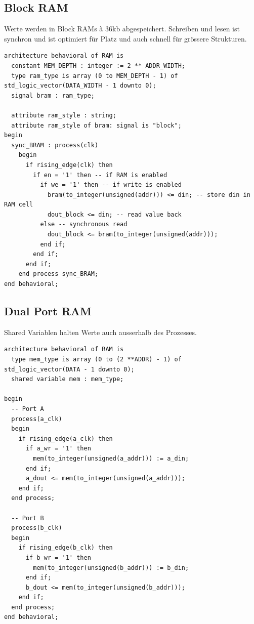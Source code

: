 \subsection{Block RAM}
Werte werden in Block RAMs à 36kb abgespeichert. Schreiben und lesen ist synchron und ist optimiert für Platz und auch schnell für grössere Strukturen.

\begin{lstlisting}
architecture behavioral of RAM is
  constant MEM_DEPTH : integer := 2 ** ADDR_WIDTH;
  type ram_type is array (0 to MEM_DEPTH - 1) of std_logic_vector(DATA_WIDTH - 1 downto 0);
  signal bram : ram_type;

  attribute ram_style : string;
  attribute ram_style of bram: signal is "block";
begin
  sync_BRAM : process(clk)
    begin
      if rising_edge(clk) then
        if en = '1' then -- if RAM is enabled
          if we = '1' then -- if write is enabled
            bram(to_integer(unsigned(addr))) <= din; -- store din in RAM cell
            dout_block <= din; -- read value back
          else -- synchronous read
            dout_block <= bram(to_integer(unsigned(addr)));
          end if;
        end if;
      end if;
    end process sync_BRAM;
end behavioral;
\end{lstlisting}

\subsection{Dual Port RAM}
Shared Variablen halten Werte auch ausserhalb des Prozesses.
\begin{lstlisting}
architecture behavioral of RAM is
  type mem_type is array (0 to (2 **ADDR) - 1) of std_logic_vector(DATA - 1 downto 0);
  shared variable mem : mem_type;
	
begin
  -- Port A
  process(a_clk) 
  begin
    if rising_edge(a_clk) then
      if a_wr = '1' then
        mem(to_integer(unsigned(a_addr))) := a_din;
      end if;
      a_dout <= mem(to_integer(unsigned(a_addr)));
    end if;
  end process;

  -- Port B
  process(b_clk) 
  begin
    if rising_edge(b_clk) then
      if b_wr = '1' then
        mem(to_integer(unsigned(b_addr))) := b_din;
      end if;
      b_dout <= mem(to_integer(unsigned(b_addr)));
    end if;
  end process;
end behavioral;
\end{lstlisting}
